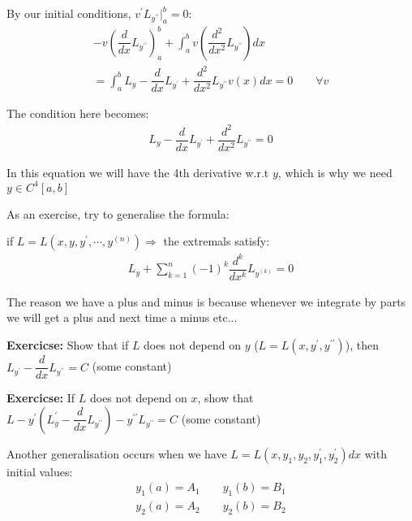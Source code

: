 \noindent By our initial conditions, $ v^{\prime}L_{y^{\prime\prime}}|_a^b = 0$:
\begin{equation*}
  \begin{gathered}
    - v\left(\dfrac{d}{dx}L_{y^{\prime\prime}}\right)_a^b+\int_{a}^{b} v\left(\dfrac{d^2}{dx^2}L_{y^{\prime\prime}}\right)dx\\
    =\int_{a}^{b}L_y-\dfrac{d}{dx}L_{y^{\prime}}+\dfrac{d^2}{dx^2}L_{y^{\prime\prime}} v(x)dx = 0\qquad\forall v
  \end{gathered}
\end{equation*}
\par\bigskip
\noindent The condition here becomes:
\begin{equation*}
  \begin{gathered}
    L_y-\dfrac{d}{dx}L_{y^{\prime}}+\dfrac{d^2}{dx^2}L_{y^{\prime\prime}}=0
  \end{gathered}
\end{equation*}
\par\bigskip
\noindent In this equation we will have the 4th derivative w.r.t $y$, which is why we need $y\in C^4[a,b]$
\par\bigskip
\noindent As an exercise, try to generalise the formula:\par
if $L = L(x,y,y^{\prime},\cdots, y^{(n)})\Rightarrow$ the extremals satisfy:
\begin{equation*}
  \begin{gathered}
    L_y+\sum_{k=1}^{n}(-1)^k\dfrac{d^k}{dx^k}L_{y^{(k)}}=0
  \end{gathered}
\end{equation*}
\par\bigskip
\noindent The reason we have a plus and minus is because whenever we integrate by parts we will get a plus and next time a minus etc...
\par\bigskip
\noindent\textbf{Exercicse:} Show that if $L$ does not depend on $y$ ($L = L(x,y^{\prime}, y^{\prime\prime})$), then $L_{y^{\prime}}-\dfrac{d}{dx}L_{y^{\prime\prime}}=C$ (some constant)
\par\bigskip
\noindent\textbf{Exercicse:} If $L$ does not depend on $x$, show that $L-y^{\prime}(L_y^{\prime}-\dfrac{d}{dx}L_{y^{\prime\prime}})-y^{\prime\prime}L_{y^{\prime\prime}} = C$ (some constant)
\par\bigskip
\noindent Another generalisation occurs when we have $L = L(x,y_1,y_2,y_1^{\prime},y_2^{\prime})dx$ with initial values:
\begin{equation*}
  \begin{gathered}
    y_1(a) = A_1\qquad y_1(b) = B_1\\
    y_2(a) = A_2\qquad y_2(b) = B_2
  \end{gathered}
\end{equation*}
